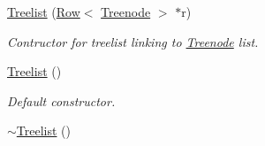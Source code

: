 \begin{DoxyCompactItemize}
\item 
\hyperlink{class_treelist_a2fa11958071a9887c0fec031d7f2b3e7}{Treelist} (\hyperlink{class_row}{Row}$<$ \hyperlink{class_treenode}{Treenode} $>$ $\ast$r)
\begin{DoxyCompactList}\small\item\em Contructor for treelist linking to \hyperlink{class_treenode}{Treenode} list. \end{DoxyCompactList}\item 
\hyperlink{class_treelist_a7aa5acf72fa6310b63bcdc1ae8a279b5}{Treelist} ()\hypertarget{class_treelist_a7aa5acf72fa6310b63bcdc1ae8a279b5}{}\label{class_treelist_a7aa5acf72fa6310b63bcdc1ae8a279b5}

\begin{DoxyCompactList}\small\item\em Default constructor. \end{DoxyCompactList}\item 
\hyperlink{class_treelist_ab1c100e36696c2d0c8e77f8f3eed2db8}{$\sim$\+Treelist} ()\hypertarget{class_treelist_ab1c100e36696c2d0c8e77f8f3eed2db8}{}\label{class_treelist_ab1c100e36696c2d0c8e77f8f3eed2db8}


\end{DoxyCompactItemize}
